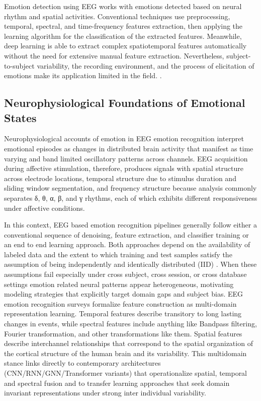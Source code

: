 \documentclass[ASNA,twocolumn]{USG}
\begin{document}
Emotion detection using EEG works with emotions detected based on neural rhythm and spatial activities. Conventional techniques use preprocessing, temporal, spectral, and time-frequency features extraction, then applying the learning algorithm for the classification of the extracted features. Meanwhile, deep learning is able to extract complex spatiotemporal features automatically without the need for extensive manual feature extraction. Nevertheless, subject-to-subject variability, the recording environment, and the process of elicitation of emotions make its application limited in the field. \cite{hamzah2024eeg}.

\subsection{Neurophysiological Foundations of Emotional States}
Neurophysiological accounts of emotion in EEG emotion recognition interpret emotional episodes as changes in distributed brain activity that manifest as time varying and band limited oscillatory patterns across channels. EEG acquisition during affective stimulation, therefore, produces signals with spatial structure across electrode locations, temporal structure due to stimulus duration and sliding window segmentation, and frequency structure because analysis commonly separates δ, θ, α, β, and γ rhythms, each of which exhibits different responsiveness under affective conditions.

In this context, EEG based emotion recognition pipelines generally follow either a conventional sequence of denoising, feature extraction, and classifier training or an end to end learning approach. Both approaches depend on the availability of labeled data and the extent to which training and test samples satisfy the assumption of being independently and identically distributed (IID) \cite{li2021can}. When these assumptions fail especially under cross subject, cross session, or cross database settings emotion related neural patterns appear heterogeneous, motivating modeling strategies that explicitly target domain gaps and subject bias.
EEG emotion recognition surveys formalize feature construction as multi-domain representation learning. Temporal features describe transitory to long lasting changes in events, while spectral features include anything like Bandpass filtering, Fourier transformation, and other transformations like them. Spatial features describe interchannel relationships that correspond to the spatial organization of the cortical structure of the human brain and its variability. This multidomain stance links directly to contemporary architectures (CNN/RNN/GNN/Transformer variants) that operationalize spatial, temporal and spectral fusion and to transfer learning approaches that seek domain invariant representations under strong inter individual variability.
\end{document}
